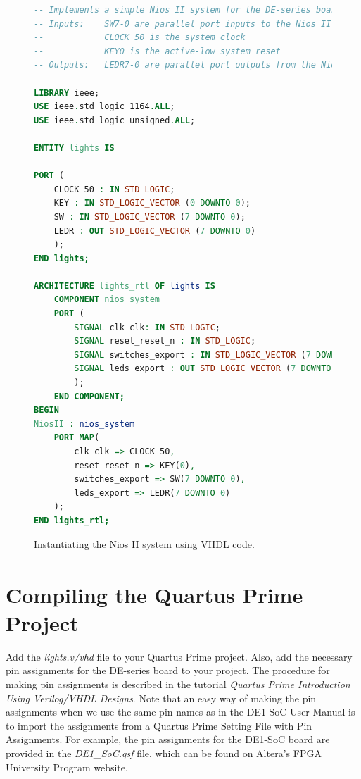 \documentclass[11pt, twoside, pdftex]{article}
\begin{document}
\begin{figure}[H]
\begin{center}
\begin{lstlisting}[language=VHDL]
-- Implements a simple Nios II system for the DE-series board.
-- Inputs:    SW7-0 are parallel port inputs to the Nios II system
--            CLOCK_50 is the system clock
--            KEY0 is the active-low system reset
-- Outputs:   LEDR7-0 are parallel port outputs from the Nios II system

LIBRARY ieee;
USE ieee.std_logic_1164.ALL;
USE ieee.std_logic_unsigned.ALL;

ENTITY lights IS

PORT (
    CLOCK_50 : IN STD_LOGIC;
    KEY : IN STD_LOGIC_VECTOR (0 DOWNTO 0);
    SW : IN STD_LOGIC_VECTOR (7 DOWNTO 0);
    LEDR : OUT STD_LOGIC_VECTOR (7 DOWNTO 0)
    );
END lights;

ARCHITECTURE lights_rtl OF lights IS
    COMPONENT nios_system
    PORT (
        SIGNAL clk_clk: IN STD_LOGIC;
        SIGNAL reset_reset_n : IN STD_LOGIC;
        SIGNAL switches_export : IN STD_LOGIC_VECTOR (7 DOWNTO 0);
        SIGNAL leds_export : OUT STD_LOGIC_VECTOR (7 DOWNTO 0)
        );
    END COMPONENT;
BEGIN
NiosII : nios_system
    PORT MAP(
        clk_clk => CLOCK_50,
        reset_reset_n => KEY(0),
        switches_export => SW(7 DOWNTO 0),
        leds_export => LEDR(7 DOWNTO 0)
    );
END lights_rtl;
\end{lstlisting}
\end{center}
	\caption{Instantiating the Nios II system using VHDL code.}
	\label{fig:23}
\end{figure}


\section{Compiling the Quartus\textsuperscript{\textregistered} Prime Project}

Add the {\it lights.v/vhd} file to your Quartus Prime project.
Also, add the necessary pin assignments for the DE-series board to your project.
The procedure for making pin assignments is described in the tutorial 
{\it Quartus Prime Introduction Using Verilog/VHDL Designs}. Note that an easy way of
making the pin assignments when we use the same pin names as in the DE1-SoC 
User Manual is to import the assignments from a Quartus Prime Setting File with Pin Assignments. 
For example, the pin assignments for the DE1-SoC board are provided in the {\it DE1\_SoC.qsf} file, 
which can be found on Altera's FPGA University Program website. 
\end{document}
